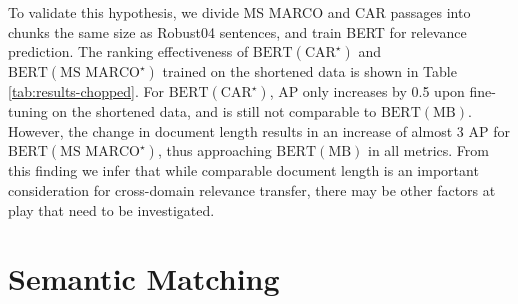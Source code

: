 To validate this hypothesis, we divide MS MARCO and CAR passages into chunks the same size as Robust04 sentences, and train BERT for relevance prediction.
The ranking effectiveness of $ \textrm{BERT}(\textrm{CAR}^{\star}) $ and $ \textrm{BERT}(\textrm{MS MARCO}^{\star}) $ trained on the shortened data is shown in Table \ref{tab:results-chopped}.
For $ \textrm{BERT}(\textrm{CAR}^{\star}) $, AP only increases by 0.5 upon fine-tuning on the shortened data, and is still not comparable to $ \textrm{BERT}(\textrm{MB}) $.
However, the change in document length results in an increase of almost 3 AP for $ \textrm{BERT}(\textrm{MS MARCO}^{\star}) $, thus approaching $ \textrm{BERT}(\textrm{MB}) $ in all metrics.
From this finding we infer that while comparable document length is an important consideration for cross-domain relevance transfer, there may be other factors at play that need to be investigated.


\section{Semantic Matching}

\begin{table*}[t!]
\centering{}
\caption{Retrieval effectiveness on pruned Robust04.}
\label{tab:results-pruned}
\end{table*}

